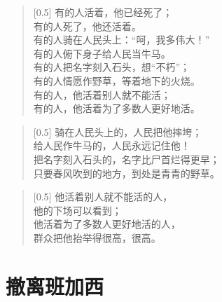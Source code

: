 \documentclass[12pt,UTF-8,openany]{ctexbook}
\begin{document}
\begin{Large}
    
    \begin{verse}[0.5\linewidth]
        有的人活着，他已经死了； \\
        有的人死了，他还活着。 \\
        有的人骑在人民头上：“呵，我多伟大！” \\
        有的人俯下身子给人民当牛马。 \\
        有的人把名字刻入石头，想“不朽”； \\
        有的人情愿作野草，等着地下的火烧。 \\
        有的人，他活着别人就不能活； \\
        有的人，他活着为了多数人更好地活。
    \end{verse}
    
    
    \begin{verse}[0.5\linewidth]
        骑在人民头上的，人民把他摔垮； \\
        给人民作牛马的，人民永远记住他！ \\
        把名字刻入石头的，名字比尸首烂得更早； \\
        只要春风吹到的地方，到处是青青的野草。
    \end{verse}
    
    
    \begin{verse}[0.5\linewidth]
        他活着别人就不能活的人， \\
        他的下场可以看到； \\
        他活着为了多数人更好地活的人， \\
        群众把他抬举得很高，很高。
    \end{verse}
    
\end{Large}

\chapter{撤离班加西}
\end{document}
